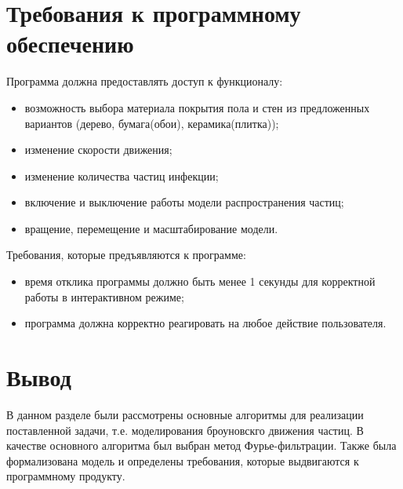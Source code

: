 \section{Требования к программному обеспечению}

Программа должна предоставлять доступ к функционалу:

\begin{itemize}
    \item возможность выбора материала покрытия пола и стен из предложенных вариантов (дерево, бумага(обои), керамика(плитка));
    \item изменение скорости движения;
    \item изменение количества частиц инфекции;
    \item включение и выключение работы модели распространения частиц;
    \item вращение, перемещение и масштабирование модели.
\end{itemize}

Требования, которые предъявляются к программе:

\begin{itemize}
    \item время отклика программы должно быть менее 1 секунды для корректной работы в интерактивном режиме;
    \item программа должна корректно реагировать на любое действие пользователя.
\end{itemize}


\section*{Вывод}

В данном разделе были рассмотрены основные алгоритмы для реализации поставленной задачи, т.е. моделирования броуновскго движения частиц. В качестве основного алгоритма был выбран метод Фурье-фильтрации. Также была формализована модель и определены требования, которые выдвигаются к программному продукту. 
